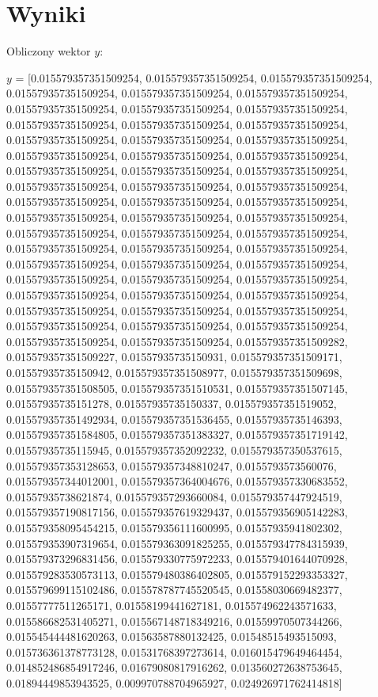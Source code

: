 \documentclass[a4paper,12pt]{article}
\begin{document}
\section{Wyniki}
Obliczony wektor \( y \):

$y$ = [0.015579357351509254, 0.015579357351509254, 0.015579357351509254, 0.015579357351509254, 0.015579357351509254, 0.015579357351509254, 0.015579357351509254, 0.015579357351509254, 0.015579357351509254, 0.015579357351509254, 0.015579357351509254, 0.015579357351509254, 0.015579357351509254, 0.015579357351509254, 0.015579357351509254, 0.015579357351509254, 0.015579357351509254, 0.015579357351509254, 0.015579357351509254, 0.015579357351509254, 0.015579357351509254, 0.015579357351509254, 0.015579357351509254, 0.015579357351509254, 0.015579357351509254, 0.015579357351509254, 0.015579357351509254, 0.015579357351509254, 0.015579357351509254, 0.015579357351509254, 0.015579357351509254, 0.015579357351509254, 0.015579357351509254, 0.015579357351509254, 0.015579357351509254, 0.015579357351509254, 0.015579357351509254, 0.015579357351509254, 0.015579357351509254, 0.015579357351509254, 0.015579357351509254, 0.015579357351509254, 0.015579357351509254, 0.015579357351509254, 0.015579357351509254, 0.015579357351509254, 0.015579357351509254, 0.015579357351509254, 0.015579357351509254, 0.015579357351509254, 0.015579357351509254, 0.015579357351509254, 0.015579357351509254, 0.015579357351509282, 0.015579357351509227, 0.01557935735150931, 0.015579357351509171, 0.01557935735150942, 0.015579357351508977, 0.015579357351509698, 0.015579357351508505, 0.015579357351510531, 0.015579357351507145, 0.01557935735151278, 0.01557935735150337, 0.015579357351519052, 0.015579357351492934, 0.015579357351536455, 0.01557935735146393, 0.015579357351584805, 0.015579357351383327, 0.015579357351719142, 0.01557935735115945, 0.015579357352092232, 0.015579357350537615, 0.015579357353128653, 0.015579357348810247, 0.0155793573560076, 0.015579357344012001, 0.015579357364004676, 0.015579357330683552, 0.01557935738621874, 0.015579357293660084, 0.015579357447924519, 0.015579357190817156, 0.015579357619329437, 0.015579356905142283, 0.015579358095454215, 0.015579356111600995, 0.01557935941802302, 0.015579353907319654, 0.015579363091825255, 0.015579347784315939, 0.015579373296831456, 0.015579330775972233, 0.015579401644070928, 0.015579283530573113, 0.015579480386402805, 0.015579152293353327, 0.015579699115102486, 0.015578787745520545, 0.01558030669482377, 0.01557777511265171, 0.01558199441627181, 0.015574962243571633, 0.015586682531405271, 0.015567148718349216, 0.01559970507344266, 0.015545444481620263, 0.01563587880132425, 0.01548515493515093, 0.015736361378773128, 0.01531768397273614, 0.016015479649464454, 0.014852486854917246, 0.01679080817916262, 0.013560272638753645, 0.01894449853943525, 0.009970788704965927, 0.024926971762414818]
\\
\\
\\
\end{document}
